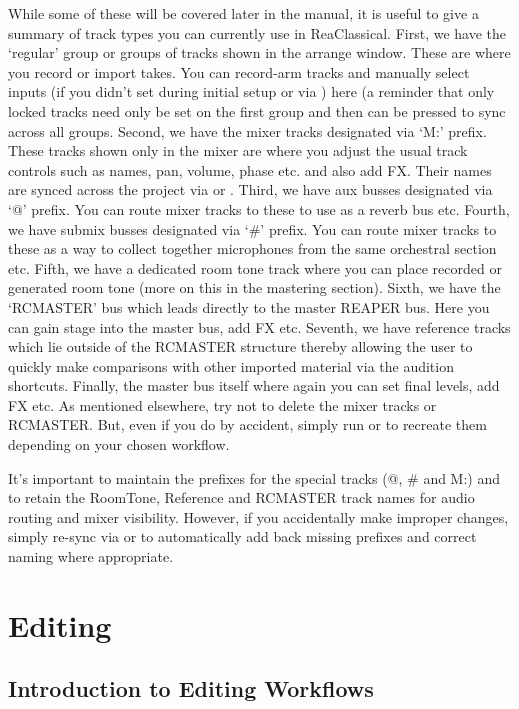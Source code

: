 \documentclass[10pt,american]{article}
\begin{document}
While some of these will be covered later in the manual, it is useful to give a
summary of track types you can currently use in ReaClassical. First, we have the
`regular' group or groups of tracks shown in the arrange window. These are where
you record or import takes. You can record-arm tracks and manually select inputs
(if you didn't set during initial setup or via ) here (a reminder
that only locked tracks need only be set on the first group and then 
can be pressed to sync across all groups. Second, we have the mixer tracks
designated via `M:' prefix. These tracks shown only in the mixer are where you
adjust the usual track controls such as names, pan, volume, phase etc. and also
add FX. Their names are synced across the project via  or .
Third, we have aux busses designated via `@' prefix. You can route mixer tracks
to these to use as a reverb bus etc. Fourth, we have submix busses designated
via `\#' prefix. You can route mixer tracks to these as a way to collect
together microphones from the same orchestral section etc. Fifth, we have a
dedicated room tone track where you can place recorded or generated room tone
(more on this in the mastering section). Sixth, we have the `RCMASTER' bus which
leads directly to the master REAPER bus. Here you can gain stage into the master
bus, add FX etc. Seventh, we have reference tracks which lie outside of the
RCMASTER structure thereby allowing the user to quickly make comparisons with
other imported material via the audition shortcuts. Finally, the master bus
itself where again you can set final levels, add FX etc. As mentioned elsewhere,
try not to delete the mixer tracks or RCMASTER. But, even if you do by accident,
simply run  or  to recreate them depending on your chosen
workflow.

It's important to maintain the prefixes for the special tracks (@, \# and M:)
and to retain the RoomTone, Reference and RCMASTER track names for audio routing
and mixer visibility. However, if you accidentally make improper changes, simply
re-sync via  or  to automatically add back missing prefixes
and correct naming where appropriate. 

\section{Editing}

\subsection{Introduction to Editing Workflows}
\end{document}
